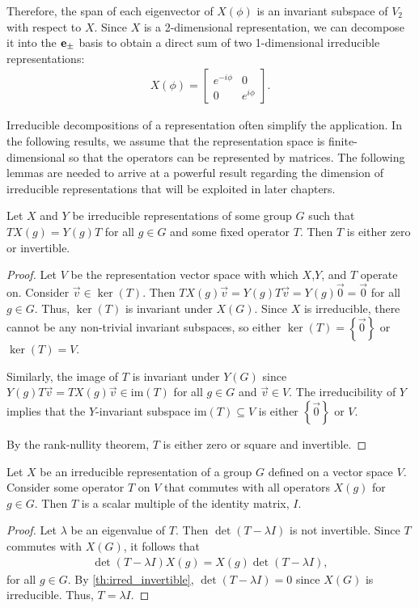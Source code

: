 \begin{example}
    Therefore, the span of each eigenvector of $X(\phi)$ is an invariant subspace of $V_2$ with respect to $X$. Since $X$ is a 2-dimensional representation, we can decompose it into the $\mathbf{e}_\pm$ basis to obtain a direct sum of two 1-dimensional irreducible representations:
    \begin{align*}
        X(\phi) = \begin{bmatrix}
            e^{-i\phi} & 0\\
            0 & e^{i\phi}
        \end{bmatrix}.
    \end{align*}
\end{example}

Irreducible decompositions of a representation often simplify the application. In the following results, we assume that the representation space is finite-dimensional so that the operators can be represented by matrices. The following lemmas are needed to arrive at a powerful result regarding the dimension of irreducible representations that will be exploited in later chapters.

\begin{lemma}\label{th:irred_invertible}
    Let $X$ and $Y$ be irreducible representations of some group $G$ such that $TX(g)=Y(g)T$ for all $g\in G$ and some fixed operator $T$. Then $T$ is either zero or invertible.
\end{lemma}
\begin{proof}
    Let $V$ be the representation vector space with which $X$,$Y$, and $T$ operate on. Consider $\vec{v}\in\ker(T)$. Then $TX(g)\vec{v} = Y(g)T\vec{v} = Y(g)\vec{0}=\vec{0}$ for all $g\in G$. Thus, $\ker(T)$ is invariant under $X(G)$. Since $X$ is irreducible, there cannot be any non-trivial invariant subspaces, so either $\ker(T) = \left\{ \vec{0} \right\}$ or $\ker(T) = V$.

    Similarly, the image of $T$ is invariant under $Y(G)$ since $Y(g)T\vec{v} = TX(g)\vec{v}\in\textrm{im}(T)$ for all $g\in G$ and $\vec{v}\in V$. The irreducibility of $Y$ implies that the $Y$-invariant subspace $\textrm{im}(T)\subseteq V$ is either $\left\{ \vec{0} \right\}$ or $V$.

    By the rank-nullity theorem, $T$ is either zero or square and invertible.
\end{proof}

\begin{lemma}\label{th:schur}
    Let $X$ be an irreducible representation of a group $G$ defined on a vector space $V$. Consider some operator $T$ on $V$ that commutes with all operators $X(g)$ for $g\in G$. Then $T$ is a scalar multiple of the identity matrix, $I$.
\end{lemma}
\begin{proof}
    Let $\lambda$ be an eigenvalue of $T$. Then $\det(T-\lambda I)$ is not invertible. Since $T$ commutes with $X(G)$, it follows that
    \begin{align*}
        \det(T-\lambda I)X(g)=X(g)\det(T-\lambda I),
    \end{align*}
    for all $g\in G$. By \cref{th:irred_invertible}, $\det(T-\lambda I) = 0$ since $X(G)$ is irreducible. Thus, $T=\lambda I$.
\end{proof}

